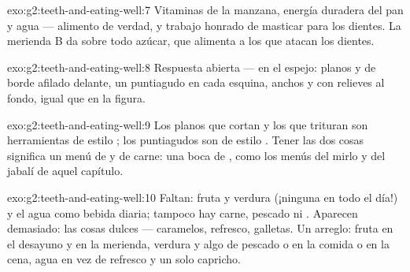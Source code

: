 \begin{solution}{exo:g2:teeth-and-eating-well:7}
Vitaminas de la manzana, energía duradera del pan y agua ---
alimento de verdad, y trabajo honrado de masticar para los dientes. La
merienda B da sobre todo azúcar, que alimenta a los  que
atacan los dientes.
\end{solution}

\begin{solution}{exo:g2:teeth-and-eating-well:8}
Respuesta abierta --- en el espejo:  planos y de borde
afilado delante, un  puntiagudo en cada esquina,  anchos
y con relieves al fondo, igual que en la figura.
\end{solution}

\begin{solution}{exo:g2:teeth-and-eating-well:9}
Los  planos que cortan y los  que trituran son
herramientas de estilo ; los  puntiagudos son de
estilo . Tener las dos cosas significa un menú de  y
de carne: una boca de , como los menús del mirlo y del jabalí
de aquel capítulo.
\end{solution}

\begin{solution}{exo:g2:teeth-and-eating-well:10}
Faltan: fruta y verdura (¡ninguna en todo el día!) y el agua como
bebida diaria; tampoco hay carne, pescado ni . Aparecen
demasiado: las cosas dulces --- caramelos, refresco, galletas. Un
arreglo: fruta en el desayuno y en la merienda, verdura y algo de
pescado o  en la comida o en la cena, agua en vez de refresco y
un solo capricho.
\end{solution}

